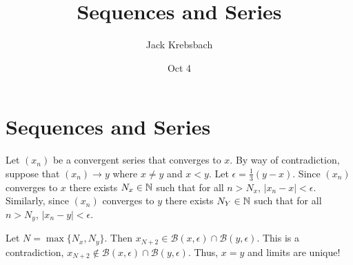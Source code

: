 \documentclass{report}
\title{Sequences and Series}
\author{Jack Krebsbach }
\date{Oct 4}
\begin{document}
\maketitle

\section{Sequences and Series}




\begin{myproof}
  Let $(x_n)$ be a convergent series that converges to $x.$ By way of contradiction, suppose that $(x_n) \rightarrow y$ where $x \neq y$ and $x < y$. Let $\epsilon = \frac{1}{3}(y-x).$  Since $(x_n)$ converges to $x$ there exists $N_x \in \NN$ such that for all $n> N_x$, $|x_n - x| < \epsilon.$ Similarly, since $(x_n)$ converges to $y$ there exists $N_Y \in \NN$ such that for all $n> N_y$, $|x_n - y| <\epsilon.$ 

  \par Let $N = \max\{N_x, N_y\}.$  Then $x_{N+2} \in \mathcal{B}(x,\epsilon) \cap \mathcal{B}(y,\epsilon)$. This is a contradiction, $x_{N+2} \not\in \mathcal{B}(x,\epsilon) \cap \mathcal{B}(y,\epsilon).$ Thus,  $x=y$ and limits are unique!
\end{myproof}

\pagebreak




















 
\end{document}
